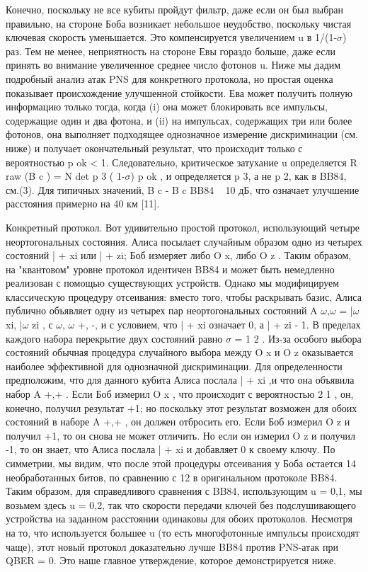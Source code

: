 Конечно, поскольку не все кубиты пройдут фильтр, даже если он был выбран правильно, на стороне Боба возникает небольшое неудобство, поскольку чистая ключевая скорость уменьшается. Это компенсируется увеличением u в 1/(1-$\sigma$) раз.
Тем не менее, неприятность на стороне Евы гораздо больше, даже если принять во внимание увеличенное среднее число фотонов u. Ниже мы дадим подробный анализ атак PNS для конкретного протокола, но простая оценка показывает происхождение улучшенной стойкости. Ева может получить полную информацию только тогда, когда (i) она может блокировать все импульсы, содержащие один и два фотона, и (ii) на импульсах, содержащих три или более фотонов, она выполняет подходящее однозначное измерение дискриминации (см. ниже) и получает окончательный результат, что происходит только с вероятностью p ok < 1. Следовательно, критическое затухание u определяется R raw (B c ) = N det p 3 ( 1-$\sigma$) p ok , и определяется p 3, а не p 2, как в BB84, см.(3). Для типичных значений, B c - B c BB84 ~ 10 дБ, что означает улучшение расстояния примерно на 40 км [11].

Конкретный протокол. Вот удивительно простой протокол, использующий четыре неортогональных состояния. Алиса посылает случайным образом одно из четырех состояний | + xi или | + zi; Боб измеряет либо O x, либо O z . Таким образом, на "квантовом" уровне протокол идентичен BB84 и может быть немедленно реализован с помощью существующих устройств. Однако мы модифицируем классическую процедуру отсеивания: вместо того, чтобы раскрывать базис, Алиса публично объявляет одну из четырех пар неортогональных состояний A $\omega$,$\omega$ = |$\omega$xi, |$\omega$ zi , с $\omega$, $\omega$ {+, -}, и с условием, что | + xi означает 0, а | + zi - 1. В пределах каждого набора перекрытие двух состояний равно $\sigma$ = 1 2 . Из-за особого выбора состояний обычная процедура случайного выбора между O x и O z оказывается наиболее эффективной для однозначной дискриминации. Для определенности предположим, что для данного кубита Алиса послала | + xi ,и что она объявила набор A +,+ . Если Боб измерил O x , что происходит с вероятностью 2 1 , он, конечно, получил результат +1; но поскольку этот результат возможен для обоих состояний в наборе A +,+ , он должен отбросить его.
Если Боб измерил O z и получил +1, то он снова не может отличить. Но если он измерил O z и получил -1, то он знает, что Алиса послала | + xi и добавляет 0 к своему ключу.
По симметрии, мы видим, что после этой процедуры отсеивания у Боба остается 14 необработанных битов, по сравнению с 12 в оригинальном протоколе BB84. Таким образом, для справедливого сравнения с BB84, использующим u = 0,1, мы возьмем здесь u = 0,2, так что скорости передачи ключей без подслушивающего устройства на заданном расстоянии одинаковы для обоих протоколов. Несмотря на то, что используется большее u (то есть многофотонные импульсы происходят чаще), этот новый протокол доказательно лучше BB84 против PNS-атак при QBER = 0. Это наше главное утверждение, которое демонстрируется ниже.

